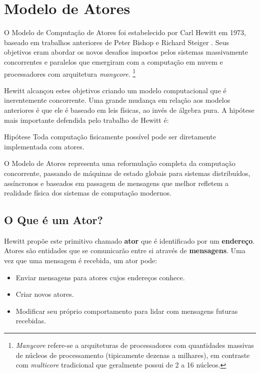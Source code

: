 \chapter{Modelo de Atores}

O Modelo de Computação de Atores foi estabelecido por Carl Hewitt em 1973, baseado em trabalhos anteriores de Peter Bishop e Richard Steiger \citep{hewitt2010actor}. Seus objetivos eram abordar os novos desafios impostos pelos sistemas massivamente concorrentes e paralelos que emergiram com a computação em nuvem e processadores com arquitetura \textit{manycore}.
\footnote{\textit{Manycore} refere-se a arquiteturas de processadores com quantidades massivas de núcleos de processamento (tipicamente dezenas a milhares), em contraste com \textit{multicore} tradicional que geralmente possui de 2 a 16 núcleos.}

Hewitt alcançou estes objetivos criando um modelo computacional que é inerentemente concorrente. Uma grande mudança em relação aos modelos anteriores é que ele é baseado em leis físicas, ao invés de álgebra pura. A hipótese mais importante defendida pelo trabalho de Hewitt é:

\begin{highlight-box}{Hipótese}
Toda computação fisicamente possível pode ser diretamente implementada com atores.
\end{highlight-box}

O Modelo de Atores representa uma reformulação completa da computação concorrente, passando de máquinas de estado globais para sistemas distribuídos, assíncronos e baseados em passagem de mensagens que melhor refletem a realidade física dos sistemas de computação modernos.

\section{O Que é um Ator?}

Hewitt propõe este primitivo chamado \textbf{ator} que é identificado por um \textbf{endereço}. Atores são entidades que se comunicarão entre si através de \textbf{mensagens}. Uma vez que uma mensagem é recebida, um ator pode:

\begin{itemize}
    \item Enviar mensagens para atores cujos endereços conhece.
    \item Criar novos atores.
    \item Modificar seu próprio comportamento para lidar com mensagens futuras recebidas.
\end{itemize}


